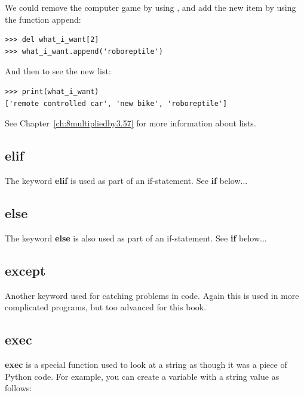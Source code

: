 \noindent
We could remove the computer game by using , and add the new item by using the function append:

\begin{listing}
\begin{verbatim}
>>> del what_i_want[2]
>>> what_i_want.append('roboreptile')
\end{verbatim}
\end{listing}

\noindent
And then to see the new list:

\begin{listing}
\begin{verbatim}
>>> print(what_i_want)
['remote controlled car', 'new bike', 'roboreptile']
\end{verbatim}
\end{listing}

\noindent
See Chapter~\ref{ch:8multipliedby3.57} for more information about lists.

\subsection*{elif}

The keyword \textbf{elif} is used as part of an if-statement.  See \textbf{if} below...

\subsection*{else}

The keyword \textbf{else} is also used as part of an if-statement.  See \textbf{if} below...

\subsection*{except}

Another keyword used for catching problems in code. Again this is used in more complicated programs, but too advanced for this book.

\subsection*{exec}

\textbf{exec} is a special function used to look at a string as though it was a piece of Python code. For example, you can create a variable with a string value as follows:

